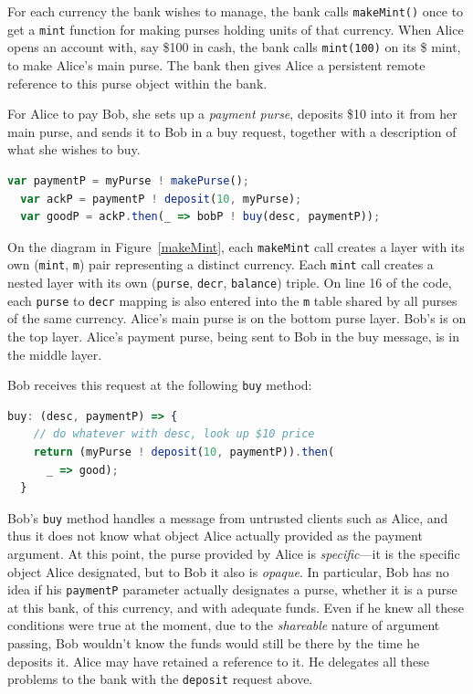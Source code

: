 \documentclass{llncs}
\begin{document}
For each currency the bank wishes to manage, the bank calls {\tt makeMint()} once to get a {\tt mint} function for making purses holding units of that currency. When Alice opens an account with, say \$100 in cash, the bank calls {\tt mint(100)} on its \$ mint, to make Alice's main purse. The bank then gives Alice a persistent remote reference to this purse object within the bank.

For Alice to pay Bob, she sets up a \emph{payment purse}, deposits \$10 into it from her main purse, and sends it to Bob in a buy request, together with a description of what she wishes to buy.
\begin{lstlisting}[language=JavaScript,numbers=none]
  var paymentP = myPurse ! makePurse();
  var ackP = paymentP ! deposit(10, myPurse);
  var goodP = ackP.then(_ => bobP ! buy(desc, paymentP));
\end{lstlisting}

On the diagram in Figure~\ref{makeMint}, each {\tt makeMint} call creates a layer with its own ({\tt mint}, {\tt m}) pair representing a distinct currency. Each {\tt mint} call creates a nested layer with its own ({\tt purse}, {\tt decr}, {\tt balance}) triple. On line 16 of the code, each {\tt purse} to {\tt decr} mapping is also entered into the {\tt m} table shared by all purses of the same currency. Alice's main purse is on the bottom purse layer. Bob's is on the top layer. Alice's payment purse, being sent to Bob in the buy message, is in the middle layer.

Bob receives this request at the following {\tt buy} method:

\begin{lstlisting}[language=JavaScript,numbers=none]
  buy: (desc, paymentP) => {
    // do whatever with desc, look up $10 price
    return (myPurse ! deposit(10, paymentP)).then(
      _ => good);
  }
\end{lstlisting}

Bob's {\tt buy} method handles a message from untrusted clients such as Alice, and thus it does not know what object Alice actually provided as the payment argument. At this point, the purse provided by Alice is \emph{specific}---it is the specific object Alice designated, but to Bob it also is \emph{opaque}. In particular, Bob has no idea if his {\tt paymentP} parameter actually designates a purse, whether it is a purse at this bank, of this currency, and with adequate funds. Even if he knew all these conditions were true at the moment, due to the \emph{shareable} nature of argument passing, Bob wouldn't know the funds would still be there by the time he deposits it. Alice may have retained a reference to it. He delegates all these problems to the bank with the {\tt deposit} request above. 
\end{document}
